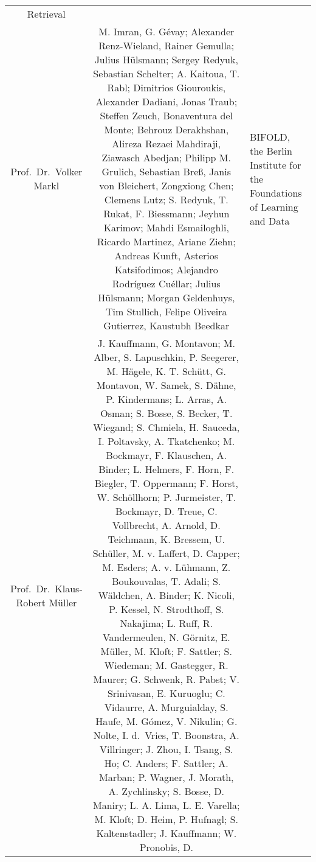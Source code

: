 \documentclass[
]{article}
\begin{document}
\begin{longtable}[]{@{}ccl@{}}
\begin{minipage}[t]{0.37\columnwidth}
Retrieval\strut
\end{minipage}\tabularnewline
\begin{minipage}[t]{0.18\columnwidth}\centering
Prof.~Dr.~Volker Markl\strut
\end{minipage} & \begin{minipage}[t]{0.37\columnwidth}\centering
M. Imran, G. Gévay; Alexander Renz-Wieland, Rainer Gemulla; Julius
Hülsmann; Sergey Redyuk, Sebastian Schelter; A. Kaitoua, T. Rabl;
Dimitrios Giouroukis, Alexander Dadiani, Jonas Traub; Steffen Zeuch,
Bonaventura del Monte; Behrouz Derakhshan, Alireza Rezaei Mahdiraji,
Ziawasch Abedjan; Philipp M. Grulich, Sebastian Breß, Janis von
Bleichert, Zongxiong Chen; Clemens Lutz; S. Redyuk, T. Rukat, F.
Biessmann; Jeyhun Karimov; Mahdi Esmailoghli, Ricardo Martinez, Ariane
Ziehn; Andreas Kunft, Asterios Katsifodimos; Alejandro Rodríguez
Cuéllar; Julius Hülsmann; Morgan Geldenhuys, Tim Stullich, Felipe
Oliveira Gutierrez, Kaustubh Beedkar\strut
\end{minipage} & \begin{minipage}[t]{0.37\columnwidth}\raggedright
BIFOLD, the Berlin Institute for the Foundations of Learning and
Data\strut
\end{minipage}\tabularnewline
\begin{minipage}[t]{0.18\columnwidth}\centering
Prof.~Dr.~Klaus-Robert Müller\strut
\end{minipage} & \begin{minipage}[t]{0.37\columnwidth}\centering
J. Kauffmann, G. Montavon; M. Alber, S. Lapuschkin, P. Seegerer, M.
Hägele, K. T. Schütt, G. Montavon, W. Samek, S. Dähne, P. Kindermans; L.
Arras, A. Osman; S. Bosse, S. Becker, T. Wiegand; S. Chmiela, H.
Sauceda, I. Poltavsky, A. Tkatchenko; M. Bockmayr, F. Klauschen, A.
Binder; L. Helmers, F. Horn, F. Biegler, T. Oppermann; F. Horst, W.
Schöllhorn; P. Jurmeister, T. Bockmayr, D. Treue, C. Vollbrecht, A.
Arnold, D. Teichmann, K. Bressem, U. Schüller, M. v. Laffert, D. Capper;
M. Esders; A. v. Lühmann, Z. Boukouvalas, T. Adali; S. Wäldchen, A.
Binder; K. Nicoli, P. Kessel, N. Strodthoff, S. Nakajima; L. Ruff, R.
Vandermeulen, N. Görnitz, E. Müller, M. Kloft; F. Sattler; S. Wiedeman;
M. Gastegger, R. Maurer; G. Schwenk, R. Pabst; V. Srinivasan, E.
Kuruoglu; C. Vidaurre, A. Murguialday, S. Haufe, M. Gómez, V. Nikulin;
G. Nolte, I. d.~Vries, T. Boonstra, A. Villringer; J. Zhou, I. Tsang, S.
Ho; C. Anders; F. Sattler; A. Marban; P. Wagner, J. Morath, A.
Zychlinsky; S. Bosse, D. Maniry; L. A. Lima, L. E. Varella; M. Kloft; D.
Heim, P. Hufnagl; S. Kaltenstadler; J. Kauffmann; W. Pronobis, D.

\end{minipage}
\end{longtable}
\end{document}
